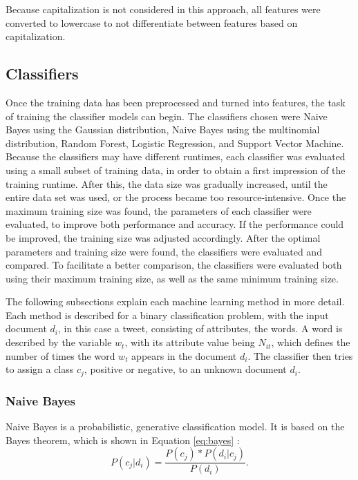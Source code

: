 Because capitalization is not considered in this approach, all features were converted to lowercase to not differentiate between features based on capitalization.

\subsection{Classifiers}
\label{sub:classifiers}

Once the training data has been preprocessed and turned into features, the task of training the classifier models can begin. The classifiers chosen were Naive Bayes using the Gaussian distribution, Naive Bayes using the multinomial distribution, Random Forest, Logistic Regression, and Support Vector Machine. Because the classifiers may have different runtimes, each classifier was evaluated using a small subset of training data, in order to obtain a first impression of the training runtime. After this, the data size was gradually increased, until the entire data set was used, or the process became too resource-intensive. Once the maximum training size was found, the parameters of each classifier were evaluated, to improve both performance and accuracy. If the performance could be improved, the training size was adjusted accordingly. After the optimal parameters and training size were found, the classifiers were evaluated and compared. To facilitate a better comparison, the classifiers were evaluated both using their maximum training size, as well as the same minimum training size.

The following subsections explain each machine learning method in more detail. Each method is described for a binary classification problem, with the input document $d_i$, in this case a tweet, consisting of attributes, the words. A word is described by the variable $w_t$, with its attribute value being $N_{it}$, which defines the number of times the word $w_t$ appears in the document $d_i$. The classifier then tries to assign a class $c_j$, positive or negative, to an unknown document $d_i$.

    \subsubsection{Naive Bayes}
    \label{sub:nb}
        Naive Bayes is a probabilistic, generative classification model. It is based on the Bayes theorem, which is shown in Equation \eqref{eq:bayes} \cite{DBLP:books/aw/TanSKK2019}:
        \begin{equation}
            \label{eq:bayes}
            P(c_j|d_i) = \frac{P(c_j) * P(d_i|c_j)}{P(d_i)}.
        \end{equation}

